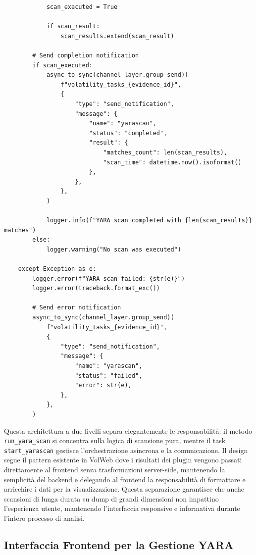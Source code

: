 \begin{verbatim}
            scan_executed = True
            
            if scan_result:
                scan_results.extend(scan_result)
        
        # Send completion notification
        if scan_executed:
            async_to_sync(channel_layer.group_send)(
                f"volatility_tasks_{evidence_id}",
                {
                    "type": "send_notification",
                    "message": {
                        "name": "yarascan",
                        "status": "completed",
                        "result": {
                            "matches_count": len(scan_results),
                            "scan_time": datetime.now().isoformat()
                        },
                    },
                },
            )
            
            logger.info(f"YARA scan completed with {len(scan_results)} matches")
        else:
            logger.warning("No scan was executed")
            
    except Exception as e:
        logger.error(f"YARA scan failed: {str(e)}")
        logger.error(traceback.format_exc())
        
        # Send error notification
        async_to_sync(channel_layer.group_send)(
            f"volatility_tasks_{evidence_id}",
            {
                "type": "send_notification",
                "message": {
                    "name": "yarascan",
                    "status": "failed",
                    "error": str(e),
                },
            },
        )
\end{verbatim}

Questa architettura a due livelli separa elegantemente le responsabilità: il metodo \texttt{run\_yara\_scan} si concentra sulla logica di scansione pura, mentre il task \texttt{start\_yarascan} gestisce l'orchestrazione asincrona e la comunicazione. Il design segue il pattern esistente in VolWeb dove i risultati dei plugin vengono passati direttamente al frontend senza trasformazioni server-side, mantenendo la semplicità del backend e delegando al frontend la responsabilità di formattare e arricchire i dati per la visualizzazione. Questa separazione garantisce che anche scansioni di lunga durata su dump di grandi dimensioni non impattino l'esperienza utente, mantenendo l'interfaccia responsive e informativa durante l'intero processo di analisi.

\subsection{Interfaccia Frontend per la Gestione YARA}

